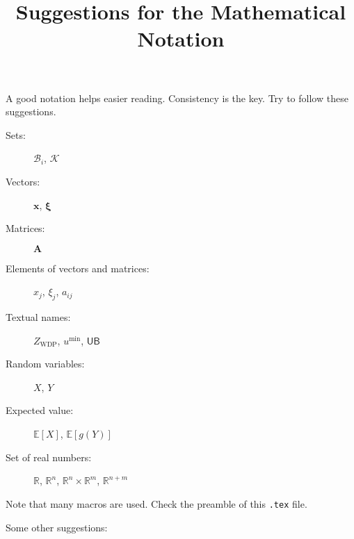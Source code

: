 \documentclass[letterpaper, 11pt]{article}
\title{Suggestions for the Mathematical Notation}
\author{}
\date{}
\renewcommand{\vec}[1]{\boldsymbol{\mathbf{#1}}}
\newcommand{\mat}[1]{\vec{#1}}
\newcommand{\set}[1]{\mathcal{#1}}
\def\Eb{\mathbb{E}}
\def\Rb{\mathbb{R}}
\newenvironment{example}
 {\VerbatimOut{\jobname.tmp}}
 {\endVerbatimOut
 \begin{center}
 \fbox{
	 \begin{minipage}[c]{\textwidth}
	  
	 \end{minipage}
   }
 \fbox{
 	\begin{minipage}[c]{\textwidth}
	 
  	\end{minipage}
  }
  \end{center}
 }
\begin{document}
\maketitle

A good notation helps easier reading. Consistency is the key. Try to follow these suggestions. 
\begin{example}
\begin{description}
\item [Sets:] $\set{B}_i$, $\set{K}$
\item [Vectors:] $\vec{x}$, $\vec{\xi}$
\item [Matrices:] $\mat{A}$
\item [Elements of vectors and matrices:] $x_j$, $\xi_j$, $a_{ij}$
\item [Textual names:] $Z_{\text{WDP}}$, $u^{\min}$, $\mathsf{UB}$
\item [Random variables:] $X$, $Y$
\item [Expected value:] $\Eb[X]$, $\Eb[g(Y)]$
\item [Set of real numbers:] $\Rb$, $\Rb^n$, $\Rb^n \times \Rb^m$, $\Rb^{n+m}$
\end{description}
\end{example}

Note that many macros are used. Check the preamble of this \texttt{.tex} file.

Some other suggestions:
\end{document}
